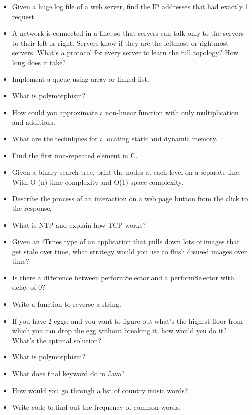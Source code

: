\documentclass{article}
\begin{document}
\begin{itemize}
	\item Given a huge log file of a web server, find the IP addresses that had exactly 1 request.
	\item A network is connected in a line, so that servers can talk only to the servers to their left or right. Servers know if they are the leftmost or rightmost servers. What's a protocol for every server to learn the full topology? How long does it take?
	\item Implement a queue using array or linked-list.
	\item What is polymorphism?
	\item How could you approximate a non-linear function with only multiplication and additions. 
	\item What are the techniques for allocating static and dynamic memory.
	\item Find the first non-repeated element in C.
	\item Given a binary search tree, print the nodes at each level on a separate line. With O (n) time complexity and O(1) space complexity.
	\item Describe the process of an interaction on a web page button from the click to the response.
	\item What is NTP and explain how TCP works?
	\item Given an iTunes type of an application that pulls down lots of images that get stale over time, what strategy would you use to flush disused images over time?
	\item Is there a difference between performSelector and a performSelector with delay of 0?
	\item Write a function to reverse a string.
	\item If you have 2 eggs, and you want to figure out what's the highest floor from which you can drop the egg without breaking it, how would you do it? What's the optimal solution?
	\item What is polymorphism?
	\item What does final keyword do in Java?
	\item How would you go through a list of country music words?
	\item Write code to find out the frequency of common words.
\end{itemize}
\end{document}
